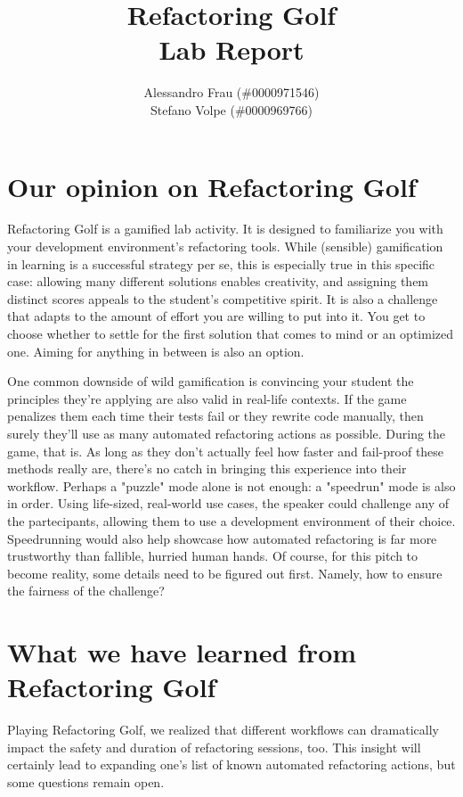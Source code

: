 \documentclass{article}
\title{
	Refactoring Golf \\
	\large{Lab Report}
}
\author{
	Alessandro Frau (\#0000971546) \\
	Stefano Volpe (\#0000969766)
}
\begin{document}
\maketitle

\section{Our opinion on Refactoring Golf}

Refactoring Golf is a gamified lab activity. It is designed to familiarize you
with your development environment's refactoring tools. While (sensible)
gamification in learning is a successful strategy per se, this is especially
true in this specific case: allowing many different solutions enables
creativity, and assigning them distinct scores appeals to the student's
competitive spirit. It is also a challenge that adapts to the amount of effort
you are willing to put into it. You get to choose whether to settle for the
first solution that comes to mind or an optimized one. Aiming for anything in
between is also an option.

One common downside of wild gamification is convincing your student the
principles they're applying are also valid in real-life contexts. If the game
penalizes them each time their tests fail or they rewrite code manually, then
surely they'll use as many automated refactoring actions as possible. During
the game, that is. As long as they don't actually feel how faster and
fail-proof these methods really are, there's no catch in bringing this
experience into their workflow. Perhaps a "puzzle" mode alone is not enough: a
"speedrun" mode is also in order. Using life-sized, real-world use cases, the
speaker could challenge any of the partecipants, allowing them to use a
development environment of their choice. Speedrunning would also help showcase
how automated refactoring is far more trustworthy than fallible, hurried human
hands. Of course, for this pitch to become reality, some details need to be
figured out first. Namely, how to ensure the fairness of the challenge?

\section{What we have learned from Refactoring Golf}

Playing Refactoring Golf, we realized that different workflows can dramatically
impact the safety and duration of refactoring sessions, too. This insight will
certainly lead to expanding one's list of known automated refactoring actions,
but some questions remain open.
\end{document}
